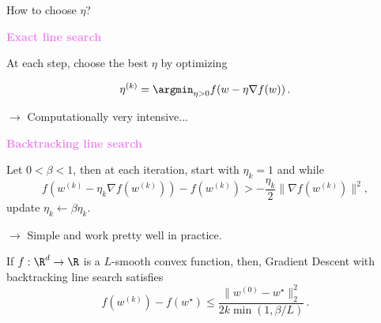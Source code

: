 \documentclass[xcolor={usenames,dvipsnames}]{beamer}
\begin{document}
\begin{frame}{How to choose $\eta$?}
	
	
\textbf{\textcolor{violet}{Exact line search}}
	
At each step, choose the best $\eta$ by optimizing
	
$$
\eta^{(k)} = \argmin_{\eta >0} f(w - \eta \nabla f(w))\,.
$$
			
\smallskip 

$\rightarrow$ \alert{Computationally very intensive...}
	
\bigskip
	
\textbf{\textcolor{violet}{ Backtracking line search}}

Let $0 < \beta < 1$, then at each iteration, start with $\eta_k = 1$ and while
$$
f( w^{(k)} - \eta_k \nabla f (w^{(k)})) - f(w^{(k)}) >  - \frac{\eta_k}{2} \|\nabla f(w^{(k)}) \|^2,
$$
update $ \eta_k \gets \beta \eta_k$.
	
\smallskip

$\rightarrow$ \alert{Simple and work pretty well in practice.}

If $f : \R^d \to \R$ is a \alert{$L$-smooth convex function}, then, Gradient Descent with backtracking line search satisfies
$$
f(w^{(k)}) - f(w^{\star}) \leq \frac{\|w^{(0)} - w^{\star}\|_2^2}{2 k \min(1, \beta/L) }\,.
$$
\end{frame}
\end{document}
